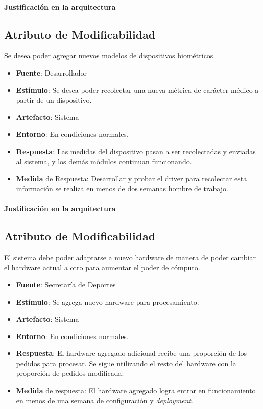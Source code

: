 \paragraph{Justificación en la arquitectura}



\subsection{Atributo de Modificabilidad}
Se desea poder agregar nuevos modelos de dispositivos biométricos.

\begin{itemize}
  \item \textbf{Fuente}: Desarrollador
  \item \textbf{Estímulo}: Se desea poder recolectar una nueva métrica de carácter médico a partir de un dispositivo.
  \item \textbf{Artefacto}: Sistema
  \item \textbf{Entorno}: En condiciones normales.
  \item \textbf{Respuesta}: Las medidas del dispositivo pasan a ser recolectadas y enviadas al sistema, y los demás módulos continuan funcionando.
  \item \textbf{Medida} de Respuesta: Desarrollar y probar el driver para recolectar esta información se realiza en menos de dos semanas hombre de trabajo.
\end{itemize}

\paragraph{Justificación en la arquitectura}



\subsection{Atributo de Modificabilidad}
El sistema debe poder adaptarse a nuevo hardware de manera de poder cambiar el hardware actual a otro para aumentar el poder de cómputo.

\begin{itemize}
  \item \textbf{Fuente}: Secretaría de Deportes
  \item \textbf{Estímulo}: Se agrega nuevo hardware para procesamiento.
  \item \textbf{Artefacto}: Sistema
  \item \textbf{Entorno}: En condiciones normales.
  \item \textbf{Respuesta}: El hardware agregado adicional recibe una proporción de los pedidos para procesar. Se sigue utilizando el resto del hardware con la proporción de pedidos modificada.
  \item \textbf{Medida} de respuesta: El hardware agregado logra entrar en funcionamiento en menos de una semana de configuración y \emph{deployment}.
\end{itemize}

